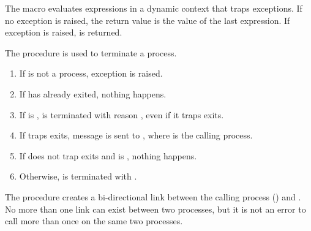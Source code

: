 The  macro evaluates expressions  
\etc{} in a dynamic context that traps exceptions.  If no exception is
raised, the return value is the value of the last expression. If
exception  is raised,  is
returned.

\begin{procedure}
\end{procedure}
\returns{} 

The  procedure is used to terminate a process.
\begin{enumerate}
\item If  is not a process, exception  is raised.
\item If  has already exited, nothing happens.
\item If  is ,  is terminated
  with reason , even if it traps exits.
\item If  traps exits, message  is sent to , where  is the
  calling process.
\item If  does not trap exits and  is
  , nothing happens.
\item Otherwise,  is terminated with .
\end{enumerate}

\begin{procedure}
\end{procedure}
\returns{} 

The  procedure creates a bi-directional link between the
calling process () and . No more than one link
can exist between two processes, but it is not an error to call
 more than once on the same two processes.

